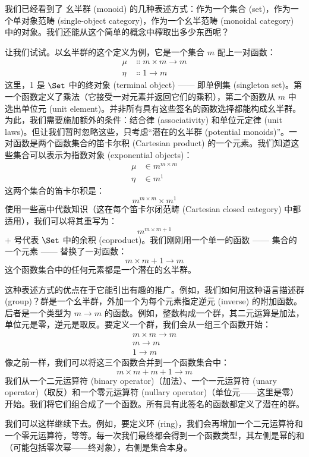 
\lettrine[lhang=0.17]{我}{们已经看到了} 幺半群 (monoid) 的几种表述方式：作为一个集合 (set)，作为一个单对象范畴 (single-object category)，作为一个幺半范畴 (monoidal category) 中的对象。我们还能从这个简单的概念中榨取出多少东西呢？

让我们试试。以幺半群的这个定义为例，它是一个集合 $m$ 配上一对函数：
\begin{align*}
  \mu  & \Colon m\times{}m \to m \\
  \eta & \Colon 1 \to m
\end{align*}
这里，1 是 $\Set$ 中的终对象 (terminal object) —— 即单例集 (singleton set)。第一个函数定义了乘法（它接受一对元素并返回它们的乘积），第二个函数从 $m$ 中选出单位元 (unit element)。并非所有具有这些签名的函数选择都能构成幺半群。为此，我们需要施加额外的条件：结合律 (associativity) 和单位元定律 (unit laws)。但让我们暂时忽略这些，只考虑“潜在的幺半群 (potential monoids)”。一对函数是两个函数集合的笛卡尔积 (Cartesian product) 的一个元素。我们知道这些集合可以表示为指数对象 (exponential objects)：
\begin{align*}
  \mu  & \in m^{m\times{}m} \\
  \eta & \in m^1
\end{align*}
这两个集合的笛卡尔积是：
\[m^{m\times{}m}\times{}m^1\]
使用一些高中代数知识（这在每个笛卡尔闭范畴 (Cartesian closed category) 中都适用），我们可以将其重写为：
\[m^{m\times{}m + 1}\]
$+$ 号代表 $\Set$ 中的余积 (coproduct)。我们刚刚用一个单一的函数 —— 集合的一个元素 —— 替换了一对函数：
\[m\times{}m + 1 \to m\]
这个函数集合中的任何元素都是一个潜在的幺半群。

这种表述方式的优点在于它能引出有趣的推广。例如，我们如何用这种语言描述群 (group)？群是一个幺半群，外加一个为每个元素指定逆元 (inverse) 的附加函数。后者是一个类型为 $m \to m$ 的函数。例如，整数构成一个群，其二元运算是加法，单位元是零，逆元是取反。要定义一个群，我们会从一组三个函数开始：
\begin{align*}
  m\times{}m \to m \\
  m \to m          \\
  1 \to m
\end{align*}
像之前一样，我们可以将这三个函数合并到一个函数集合中：
\[m\times{}m + m + 1 \to m\]
我们从一个二元运算符 (binary operator)（加法）、一个一元运算符 (unary operator)（取反）和一个零元运算符 (nullary operator)（单位元——这里是零）开始。我们将它们组合成了一个函数。所有具有此签名的函数都定义了潜在的群。

我们可以这样继续下去。例如，要定义环 (ring)，我们会再增加一个二元运算符和一个零元运算符，等等。每一次我们最终都会得到一个函数类型，其左侧是幂的和（可能包括零次幂——终对象），右侧是集合本身。

